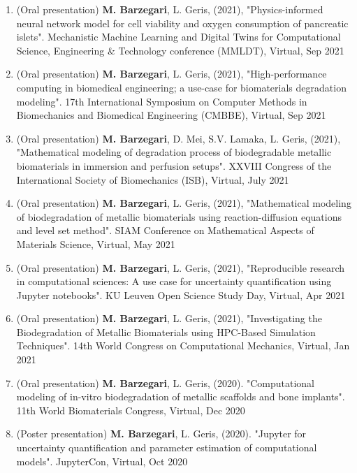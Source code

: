 \documentclass{cv}
\begin{document}
\begin{enumerate}
\item
(Oral presentation)
\textbf{M. Barzegari}, L. Geris, (2021), "Physics-informed neural network model for cell viability and oxygen consumption of pancreatic islets". Mechanistic Machine Learning and Digital Twins for Computational Science, Engineering \& Technology conference (MMLDT), Virtual, Sep 2021
\item
(Oral presentation)
\textbf{M. Barzegari}, L. Geris, (2021), "High-performance computing in biomedical engineering; a use-case for biomaterials degradation modeling". 17th International Symposium on Computer Methods in Biomechanics and Biomedical Engineering (CMBBE), Virtual, Sep 2021
\item
(Oral presentation)
\textbf{M. Barzegari}, D. Mei, S.V. Lamaka, L. Geris, (2021), "Mathematical modeling of degradation process of biodegradable metallic biomaterials in immersion and perfusion setups". XXVIII Congress of the International Society of Biomechanics (ISB), Virtual, July 2021
\item
(Oral presentation)
\textbf{M. Barzegari}, L. Geris, (2021), "Mathematical modeling of biodegradation of metallic biomaterials using reaction-diffusion equations and level set method". SIAM Conference on Mathematical Aspects of Materials Science, Virtual, May 2021
\item
(Oral presentation)
\textbf{M. Barzegari}, L. Geris, (2021), "Reproducible research in computational sciences: A use case for uncertainty quantification using Jupyter notebooks". KU Leuven Open Science Study Day, Virtual, Apr 2021
\item
(Oral presentation)
\textbf{M. Barzegari}, L. Geris, (2021), "Investigating the Biodegradation of Metallic Biomaterials using HPC-Based Simulation Techniques". 14th World Congress on Computational Mechanics, Virtual, Jan 2021
\item
(Oral presentation) 
\textbf{M. Barzegari}, L. Geris, (2020). "Computational modeling of in-vitro biodegradation of metallic scaffolds and bone implants". 11th World Biomaterials Congress, Virtual, Dec 2020
\item
(Poster presentation) 
\textbf{M. Barzegari}, L. Geris, (2020). "Jupyter for uncertainty quantification and parameter estimation of computational models". JupyterCon, Virtual, Oct 2020

\end{enumerate}
\end{document}
